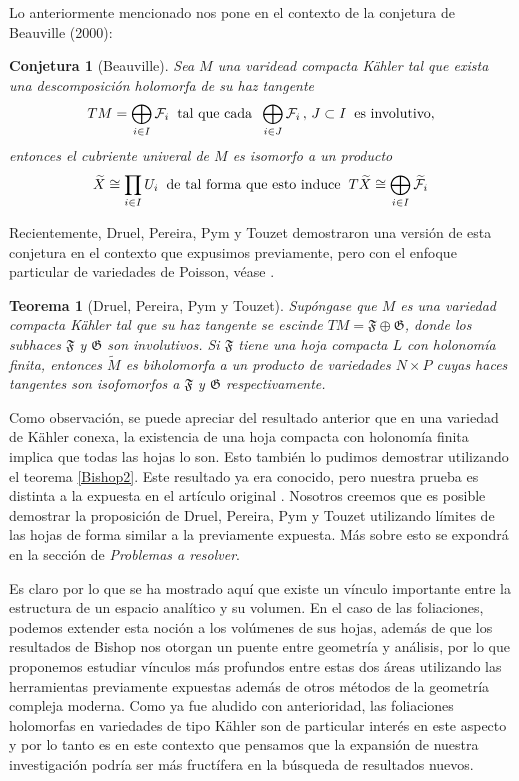 \documentclass{article}
\newtheorem{teorema}{Teorema}[section]
\newtheorem{conjetura}{Conjetura}
\begin{document}
Lo anteriormente mencionado nos pone en el contexto de la conjetura de Beauville (2000):
\begin{conjetura}[Beauville]\label{Beauville}
        Sea $M$ una varidead compacta K\"ahler tal que exista una descomposici\'on holomorfa de su haz tangente
        \[
        TM=\bigoplus_{i\in I}\mathcal{F}_i\hspace{0.2cm}\text{tal que cada}\hspace{0.2cm}\bigoplus_{i\in J}\mathcal{F}_i\,,\,J\subset I\hspace{0.2cm}\text{es involutivo},
        \]
        entonces el cubriente univeral de $M$ es isomorfo a un producto 
        \[
        \widetilde{X}\cong\prod_{i\in I}U_i\hspace{0.2cm}\text{de tal forma que esto induce}\hspace{0.2cm}T\widetilde{X}\cong\bigoplus_{i\in I}\widetilde{\mathcal{F}}_i
        \]
\end{conjetura}
Recientemente, Druel, Pereira, Pym y Touzet demostraron una versi\'on de esta conjetura en el contexto que expusimos previamente,
pero con el enfoque particular de variedades de Poisson, v\'ease \cite{DPPT}.
\begin{teorema}[Druel, Pereira, Pym y Touzet]\label{DPPT}
        Sup\'ongase que $M$ es una variedad compacta K\"ahler tal que su haz tangente se escinde $TM=\mathfrak{F}\oplus\mathfrak{G}$, donde
        los subhaces $\mathfrak{F}$ y $\mathfrak{G}$ son involutivos. Si $\mathfrak{F}$ tiene una hoja compacta $L$ con holonom\'ia finita,
        entonces $\widetilde{M}$ es biholomorfa a un producto de variedades $N\times P$ cuyas haces tangentes son isofomorfos
        a $\mathfrak{F}$ y $\mathfrak{G}$ respectivamente.
\end{teorema}
\noindent Como observaci\'on, se puede apreciar del resultado anterior que en una variedad de K\"ahler conexa, la existencia 
de una hoja compacta con holonom\'ia finita implica que todas las hojas lo son. Esto tambi\'en lo pudimos demostrar utilizando 
el teorema \ref{Bishop2}. Este resultado ya era conocido, pero nuestra prueba es distinta a la expuesta en el art\'iculo 
original \cite{Pereira}. 
Nosotros creemos que es posible demostrar la proposici\'on de Druel, Pereira, Pym y Touzet utilizando l\'imites de las hojas 
de forma similar a la previamente expuesta. M\'as sobre esto se expondr\'a en la secci\'on de \textit{Problemas a resolver}.

Es claro por lo que se ha mostrado aqu\'i que existe un v\'inculo importante entre la estructura de un espacio anal\'itico y su volumen.
En el caso de las foliaciones, podemos extender esta noci\'on a los vol\'umenes de sus hojas, adem\'as de que los resultados de Bishop 
nos otorgan un puente entre geometr\'ia y an\'alisis, por lo que proponemos  estudiar v\'inculos m\'as profundos entre estas
dos \'areas utilizando las herramientas previamente expuestas adem\'as de otros m\'etodos de la geometr\'ia compleja moderna.
Como ya fue aludido con anterioridad, las foliaciones holomorfas en variedades de tipo K\"ahler son de particular inter\'es en este aspecto
y por lo tanto es en este contexto que pensamos que la expansi\'on de nuestra investigaci\'on podr\'ia ser m\'as fruct\'ifera en la
b\'usqueda de resultados nuevos.
\end{document}
